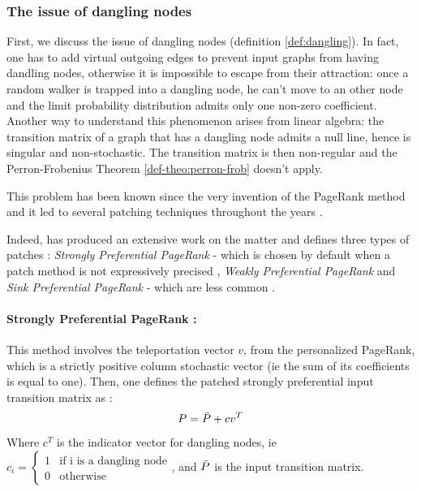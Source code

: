 \documentclass[sn-mathphys]{sn-jnl}%
\theoremstyle{thmstyleone}%
\theoremstyle{thmstyletwo}%
\theoremstyle{thmstylethree}%
\begin{document}
\subsubsection{The issue of dangling nodes}
\label{subsec:dandling}
First, we discuss the issue of dangling nodes (definition
\ref{def:dangling}).  In fact, one has to add virtual outgoing edges
to prevent input graphs from having dandling nodes, otherwise it is
impossible to escape from their attraction: once a random walker is
trapped into a dangling node, he can't move to an other node and the
limit probability distribution admits only one non-zero
coefficient. Another way to understand this phenomenon arises from
linear algebra: the transition matrix of a graph that has a dangling
node admits a null line, hence is singular and non-stochastic. The
transition matrix is then non-regular and the Perron-Frobenius Theorem
\ref{def-theo:perron-frob} doesn't apply.

This problem has been known since the very invention of the PageRank
method \cite{brin_page_1998} and it led to several patching techniques
throughout the years \cite{gleich_2015, langville_meyer_2004,
  boldi_posenato_santini_vigna}.


Indeed, \cite{boldi_posenato_santini_vigna} has produced an extensive
work on the matter and defines three types of patches :
\textit{Strongly Preferential PageRank} - which is chosen by default
when a patch method is not expressively precised \cite{gleich_2015},
\textit{Weakly Preferential PageRank} and \textit{Sink Preferential
  PageRank} - which are less common \cite{gleich_2015}.

\paragraph{Strongly Preferential PageRank \cite{gleich_2015}:}
This method involves the teleportation vector $v$, from the
personalized PageRank, which is a strictly positive column stochastic
vector (ie the sum of its coefficients is equal to one). Then, one
defines the patched strongly preferential input transition matrix as :
\begin{equation}
    P = \Bar{P} + cv^T 
\end{equation}
Where $c^T$ is the indicator vector for dangling nodes, ie $c_i = \left\{ \begin{array}{cc} 
    1 & \mbox{if i is a dangling node} \\
    0 & \mbox{otherwise}
\end{array} \right.$, and $\Bar{P}$ is the input transition matrix. 
\end{document}
